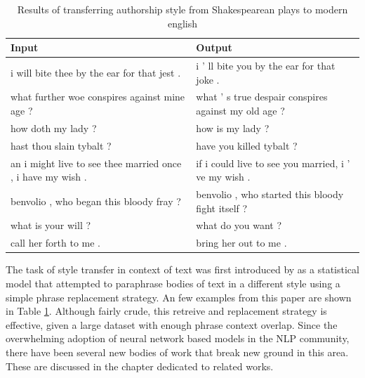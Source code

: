 \begin{table}[ht]
	\centering
	\begin{tabular}{ | p{.45\linewidth} | p{.45\linewidth} | }
		\hline
		\textbf{Input}                                              & \textbf{Output}                                      \\
		\hline \hline
		i will bite thee by the ear for that jest .                 & i ’ ll bite you by the ear for that joke .           \\
		\hline
		what further woe conspires against mine age ?               & what ’ s true despair conspires against my old age ? \\
		\hline
		how doth my lady ?                                          & how is my lady ?                                     \\
		\hline
		hast thou slain tybalt ?                                    & have you killed tybalt ?                             \\
		\hline
		an i might live to see thee married once , i have my wish . & if i could live to see you married, i ’ ve my wish . \\
		\hline
		benvolio , who began this bloody fray ?                     & benvolio , who started this bloody fight itself ?    \\
		\hline
		what is your will ?                                         & what do you want ?                                   \\
		\hline
		call her forth to me .                                      & bring her out to me .                                \\
		\hline
	\end{tabular}
	\caption{Results of transferring authorship style from Shakespearean plays to modern english}
	\label{tab:paraphrasing-for-style-results}
\end{table}

The task of style transfer in context of text was first introduced by \cite{xu2012paraphrasing} as a statistical model that attempted to paraphrase bodies of text in a different style using a simple phrase replacement strategy. An few examples from this paper are shown in Table \ref{tab:paraphrasing-for-style-results}. Although fairly crude, this retreive and replacement strategy is effective, given a large dataset with enough phrase context overlap. Since the overwhelming adoption of neural network based models in the NLP community, there have been several new bodies of work that break new ground in this area. These are discussed in the chapter dedicated to related works.


